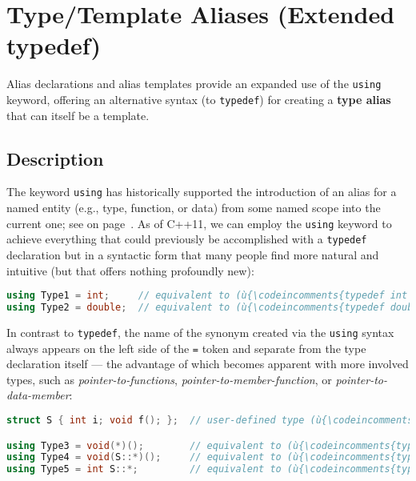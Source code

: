 \newpage
\section[{\tt using} Aliases]{Type/Template Aliases (Extended {\SecCode typedef})}\label{alias-declarations-and-alias-templates}


Alias declarations and alias templates provide an expanded use of the
\texttt{using} keyword, offering an alternative syntax (to
\texttt{typedef}) for creating a \textbf{type alias} that can itself be
a template.

\subsection[Description]{Description}\label{description}

The keyword \texttt{using} has historically supported the introduction
of an alias for a named entity (e.g., type, function, or data) from some
named scope into the current one; see {\it{}} on page~\pageref{appendix:-brief-review-of-(c++03)-using-declarations}. As of C++11, we can
employ the \texttt{using} keyword to achieve everything that could
previously be accomplished with a \texttt{typedef} declaration but in a
syntactic form that many people find more natural and intuitive (but
that offers nothing profoundly new):

\begin{lstlisting}[language=C++]
using Type1 = int;     // equivalent to (ù{\codeincomments{typedef int Type1;}}ù)
using Type2 = double;  // equivalent to (ù{\codeincomments{typedef double Type2;}}ù)
\end{lstlisting}

\noindent In contrast to \texttt{typedef}, the name of the synonym created via the
\texttt{using} syntax always appears on the left side of the \texttt{=}
token and separate from the type declaration itself --- the advantage of
which becomes apparent with more involved types, such as
\emph{pointer-to-functions}, \emph{pointer-to-member-function}, or
\emph{pointer-to-data-member}:

\begin{lstlisting}[language=C++]
struct S { int i; void f(); };  // user-defined type (ù{\codeincomments{S}}ù) defined at file scope

using Type3 = void(*)();        // equivalent to (ù{\codeincomments{typedef void(*Type3)();}}ù)
using Type4 = void(S::*)();     // equivalent to (ù{\codeincomments{typedef void(S::*Type4)();}}ù)
using Type5 = int S::*;         // equivalent to (ù{\codeincomments{typedef int S::*Type5;}}ù)
\end{lstlisting}

